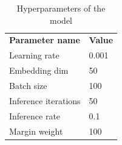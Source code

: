 \documentclass[11pt,letterpaper]{article}
\begin{document}
%
\begin{table}[]
\centering
\caption{Hyperparameters of the model}
\label{params}
\begin{tabular}{ll}
\textbf{Parameter name} & \textbf{Value} \\
Learning rate           & 0.001          \\
Embedding dim           & 50             \\
Batch size              & 100            \\
Inference iterations    & 50             \\
Inference rate          & 0.1            \\
Margin weight           & 100           
\end{tabular}
\end{table}
\end{document}
